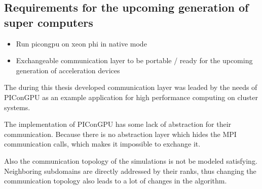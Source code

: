 


\subsection{Requirements for the upcoming generation of super computers}
\begin{itemize}
\item Run picongpu on xeon phi in native mode
\item Exchangeable communication layer to be portable / ready for the
  upcoming generation of acceleration devices
\end{itemize}


The during this thesis developed communication layer was leaded by the
needs of PIConGPU as an example application for high performance
computing on cluster systems.

The implementation of PIConGPU has some lack of abstraction for their
communication. Because there is no abstraction layer which hides the
MPI communication calls, which makes it impossible to exchange it.

Also the communication topology of the simulations is not be modeled
satisfying. Neighboring subdomains are directly addressed by their
ranks, thus changing the communication topology also leads to a lot of
changes in the algorithm.



\cleardoublepage

